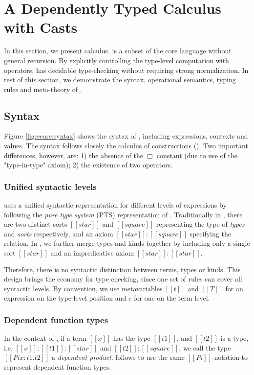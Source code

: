 
\section{A Dependently Typed Calculus with Casts}\label{sec:ecore}

In this section, we present \ecore calculus. \ecore is a subset of the core
language \name without general recursion. By explicitly controlling the type-level
computation with \cast operators, \ecore has decidable type-checking
without requiring strong normalization. In rest of this
section, we demonstrate the syntax, operational semantics, typing
rules and meta-theory of \ecore.

\subsection{Syntax}\label{sec:ecore:syn}
Figure \ref{fig:ecore:syntax} shows the syntax of \ecore, including
expressions, contexts and values. The syntax follows closely the
calculus of constructions (\cc). Two important differences, however, are: 1)
the absence of the $\Box$ constant (due to use of the "type-in-type"
axiom); 2) the existence of two \cast operators.

\subsubsection{Unified syntactic levels}
\ecore uses a unified syntactic representation for different levels of
expressions by following the \emph{pure type system} (PTS)
representation of \cc. Traditionally in \cc, there are two distinct
sorts $[[star]]$ and $[[square]]$ representing the type of
\emph{types} and \emph{sorts} respectively, and an axiom
$[[star]]:[[square]]$ specifying the relation. In \ecore, we further
merge types and kinds together by including only a single sort
$[[star]]$ and an impredicative axiom $[[star]]:[[star]]$. 

Therefore, there is no syntactic distinction between terms, types or
kinds. This design brings the economy for type checking, since one set
of rules can cover all syntactic levels. By convention, we use
metavariables $[[t]]$ and $[[T]]$ for an expression on the type-level
position and $e$ for one on the term level.

\subsubsection{Dependent function types}
In the context of \cc, if a term $[[x]]$ has the type $[[t1]]$, and $[[t2]]$ is a type, i.e. $[[x]]:[[t1]]:[[star]]$ and $[[t2]]:[[square]]$, we call the type $[[Pi x:t1.t2]]$ a \emph{dependent product}. \ecore follows \cc to use the same $[[Pi]]$-notation to represent dependent function types.

